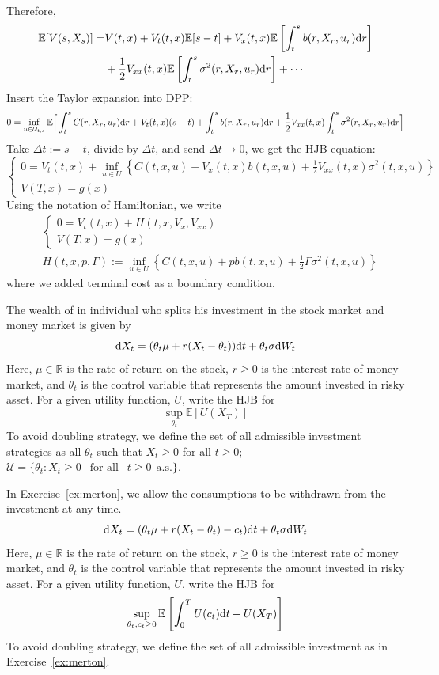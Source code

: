 \documentclass[11pt]{book}
\newcommand{\dd}{\text{\normalfont d}}
\newcommand{\dt}{\text{\normalfont d}t}
\newcommand{\dr}{\text{\normalfont d}r}
\newcommand{\dW}{\text{\normalfont d}W}
\begin{document}
Therefore,
\[
\begin{split}
    \mathbb{E}[V(s,X_s)]  = & V(t,x) + V_t(t,x)\mathbb{E}[s-t]+V_x(t,x)\mathbb{E}\left[\int_t^s  b(r,X_r,u_r)\dr\right] \\
     &+ \frac12 V_{xx}(t,x)\mathbb{E}\left[\int_t^s  \sigma^2(r,X_r,u_r)\dr\right] + \cdots
\end{split}
\]
Insert the Taylor expansion into DPP:
\[
\begin{split}
    0= \inf_{u\in\mathcal{U}_{t,s}}\mathbb{E}\Big[\int_t^s  C(r,X_r,u_r){\dr} + V_t(t,x)(s-t) +\int_t^s  b(r,X_r,u_r)\dr+\frac12 V_{xx}(t,x)\int_t^s  \sigma^2(r,X_r,u_r)\dr\Big]
\end{split}
\]
Take $\Delta t:=s-t$, divide by $\Delta t$, and send $\Delta t\to 0$, we get the HJB equation:
\[
    \begin{cases}
    0= V_t(t,x) + \inf_{u\in U}\left\{ C(t,x,u)  + V_x(t,x) b(t,x,u)+\frac12 V_{xx}(t,x) \sigma^2(t,x,u)\right\}\\
    V(T,x)=g(x)
\end{cases}
\]
Using the notation of Hamiltonian, we write
\begin{align}
     &\begin{cases}
    0= V_t(t,x) + H(t,x,V_x,V_{xx})\\
    V(T,x)=g(x)
\end{cases}\label{eqn:HJB}\\
&\hspace{0cm}H(t,x,p,\Gamma):=\inf_{u\in U}\left\{ C(t,x,u)  + p b(t,x,u)+\frac12 \Gamma \sigma^2(t,x,u)\right\}\label{eqn:Hamilton_1d}
\end{align}
where we added terminal cost as a boundary condition.
\begin{ex}\label{ex:merton}
    The wealth of in individual who splits his investment in the stock market and money market is given by
    \[
    \dd X_t = (\theta_t \mu + r(X_t-\theta_t))\dt + \theta_t \sigma \dW_t
    \]
    Here, $\mu\in\mathbb{R}$ is the rate of return on the stock, $r\ge0$ is the interest rate of money market,  and $\theta_t$ is the control variable that represents the amount invested in risky asset. 
    For a given utility function, $U$, write the HJB for 
    \[
    \sup_{\theta_t}\mathbb{E}[U(X_T)]
    \]
    To avoid doubling strategy, we define the set of all admissible investment strategies as all $\theta_t$ such that $X_t\ge0$ for all $t\ge0$; $\mathcal{U}=\{\theta_t:X_t\ge0~~\text{ for all }~~t\ge0~~\text{a.s.}\}$.
\end{ex}
\begin{ex}\label{ex:merton_w_consumption}
    In Exercise~\ref{ex:merton}, we allow the consumptions to be withdrawn from the investment at any time.
    \[
    \dd X_t = (\theta_t \mu + r(X_t-\theta_t)-c_t)\dt + \theta_t \sigma \dW_t
    \]
    Here, $\mu\in\mathbb{R}$ is the rate of return on the stock, $r\ge0$ is the interest rate of money market,  and $\theta_t$ is the control variable that represents the amount invested in risky asset. 
    For a given utility function, $U$, write the HJB for 
    \[
    \sup_{\theta_t,c_t\ge0}\mathbb{E}\left[\int_0^TU(c_t)\dt + U(X_T)\right]
    \]
    To avoid doubling strategy, we define the set of all admissible investment as in Exercise~\ref{ex:merton}.
\end{ex}
\end{document}

